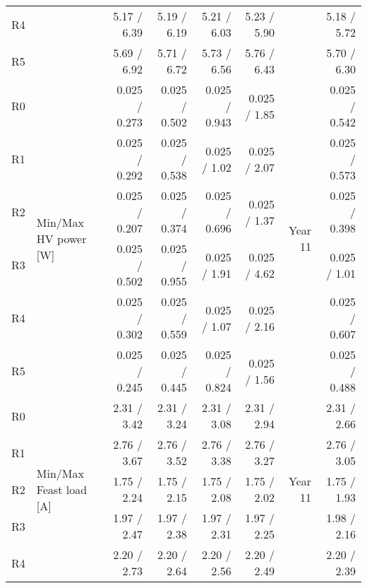 \begin{table}[ht]
\begin{centering}
{\begin{tabular}{|l|l|r|r|r|r|r|r|}
R4                              &                                              &   5.17 / 6.39 &   5.19 / 6.19 &   5.21 / 6.03 &   5.23 / 5.90 &  &   5.18 / 5.72 \\ 
R5                              &                                              &   5.69 / 6.92 &   5.71 / 6.72 &   5.73 / 6.56 &   5.76 / 6.43 &  &   5.70 / 6.30 \\ \hline
R0                              & \multirow{6}{*}{Min/Max HV power [W]}        & 0.025 / 0.273 & 0.025 / 0.502 & 0.025 / 0.943 &  0.025 / 1.85 & \multirow{6}{*}{Year 11} & 0.025 / 0.542 \\ 
R1                              &                                              & 0.025 / 0.292 & 0.025 / 0.538 &  0.025 / 1.02 &  0.025 / 2.07 &  & 0.025 / 0.573 \\ 
R2                              &                                              & 0.025 / 0.207 & 0.025 / 0.374 & 0.025 / 0.696 &  0.025 / 1.37 &  & 0.025 / 0.398 \\ 
R3                              &                                              & 0.025 / 0.502 & 0.025 / 0.955 &  0.025 / 1.91 &  0.025 / 4.62 &  &  0.025 / 1.01 \\ 
R4                              &                                              & 0.025 / 0.302 & 0.025 / 0.559 &  0.025 / 1.07 &  0.025 / 2.16 &  & 0.025 / 0.607 \\ 
R5                              &                                              & 0.025 / 0.245 & 0.025 / 0.445 & 0.025 / 0.824 &  0.025 / 1.56 &  & 0.025 / 0.488 \\ \hline
R0                              & \multirow{6}{*}{Min/Max Feast load [A]}      &   2.31 / 3.42 &   2.31 / 3.24 &   2.31 / 3.08 &   2.31 / 2.94 & \multirow{6}{*}{Year 11} &   2.31 / 2.66 \\ 
R1                              &                                              &   2.76 / 3.67 &   2.76 / 3.52 &   2.76 / 3.38 &   2.76 / 3.27 &  &   2.76 / 3.05 \\ 
R2                              &                                              &   1.75 / 2.24 &   1.75 / 2.15 &   1.75 / 2.08 &   1.75 / 2.02 &  &   1.75 / 1.93 \\ 
R3                              &                                              &   1.97 / 2.47 &   1.97 / 2.38 &   1.97 / 2.31 &   1.97 / 2.25 &  &   1.98 / 2.16 \\ 
R4                              &                                              &   2.20 / 2.73 &   2.20 / 2.64 &   2.20 / 2.56 &   2.20 / 2.49 &  &   2.20 / 2.39 \\ 

\end{tabular}}
\end{centering}
\end{table}
